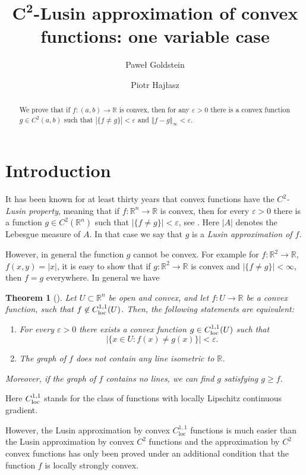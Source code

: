 \documentclass[intlimits,12pt,reqno]{amsart}
\title[Approximation of convex functions]{$\mathbf{C^2}$-Lusin approximation of convex functions: one variable case}
\author[P. Goldstein]{Pawe\l{}  Goldstein}
\author[Haj\l{}asz]{Piotr Haj\l{}asz}
\newcommand{\bbbr}{\mathbb R}
\newcommand{\R}{\mathbb R}
\newcommand{\eps}{\varepsilon}
\newtheorem{theorem}{Theorem}[section]
\theoremstyle{definition}
\newcommand*{\loc}{{\mathrm{loc}}}
\begin{document}
\begin{abstract}
We prove that if $f:(a,b)\to\R$ is convex, then for any $\eps>0$ there is a convex function $g\in C^2(a,b)$ such that $|\{f\neq g\}|<\eps$ and $\Vert f-g\Vert_\infty<\eps$.
\end{abstract}


\maketitle



\section{Introduction}
\label{intro}

It has been known for at least thirty years that convex functions have the {\em $C^2$-Lusin property}, meaning that if $f:\R^n\to\R$ is convex, then for every $\eps>0$ there is a function $g\in C^2(\R^n)$ such that $|\{f\neq g\}|<\eps$, see \cite{Alberti2,EvansGangbo,Imomkulov}. Here $|A|$ denotes the Lebesgue measure of $A$. In that case we say that $g$ is a {\em Lusin approximation of $f$}.

However, in general the function $g$ cannot be convex. For example for $f:\R^2\to\R$, $f(x,y)=|x|$, it is easy to show that if $g:\R^2\to\R$ is convex and $|\{f\neq g\}|<\infty$, then $f=g$ everywhere. In general we have
\begin{theorem}[\cite{ACH,AH}]
\label{T1}
Let $U\subset\R^n$ be open and convex, and let $f:U\to\R$ be a convex function, such that $f\not\in C^{1,1}_{\rm loc}(U)$. Then, the following statements are equivalent:
\begin{enumerate}
\item For every $\varepsilon>0$ there exists a convex function $g\in C^{1,1}_{\rm loc}(U)$  such that
$$
|\{x\in U : f(x)\neq g(x)\}|<\varepsilon.
$$
\item The graph of $f$ does not contain any line isometric to $\bbbr$.
\end{enumerate}
Moreover, if the graph of $f$ contains no lines, we can find $g$ satisfying $g\geq f$.
\end{theorem}
Here $C^{1,1}_{\rm loc}$ stands for the class of functions with locally Lipschitz continuous gradient.

However, the Lusin approximation by convex $C^{1,1}_{\loc}$ functions is much easier than the Lusin approximation by convex $C^2$ functions and the approximation by $C^2$ convex functions has only been proved under an additional condition that the function $f$ is locally strongly convex.
\end{document}
